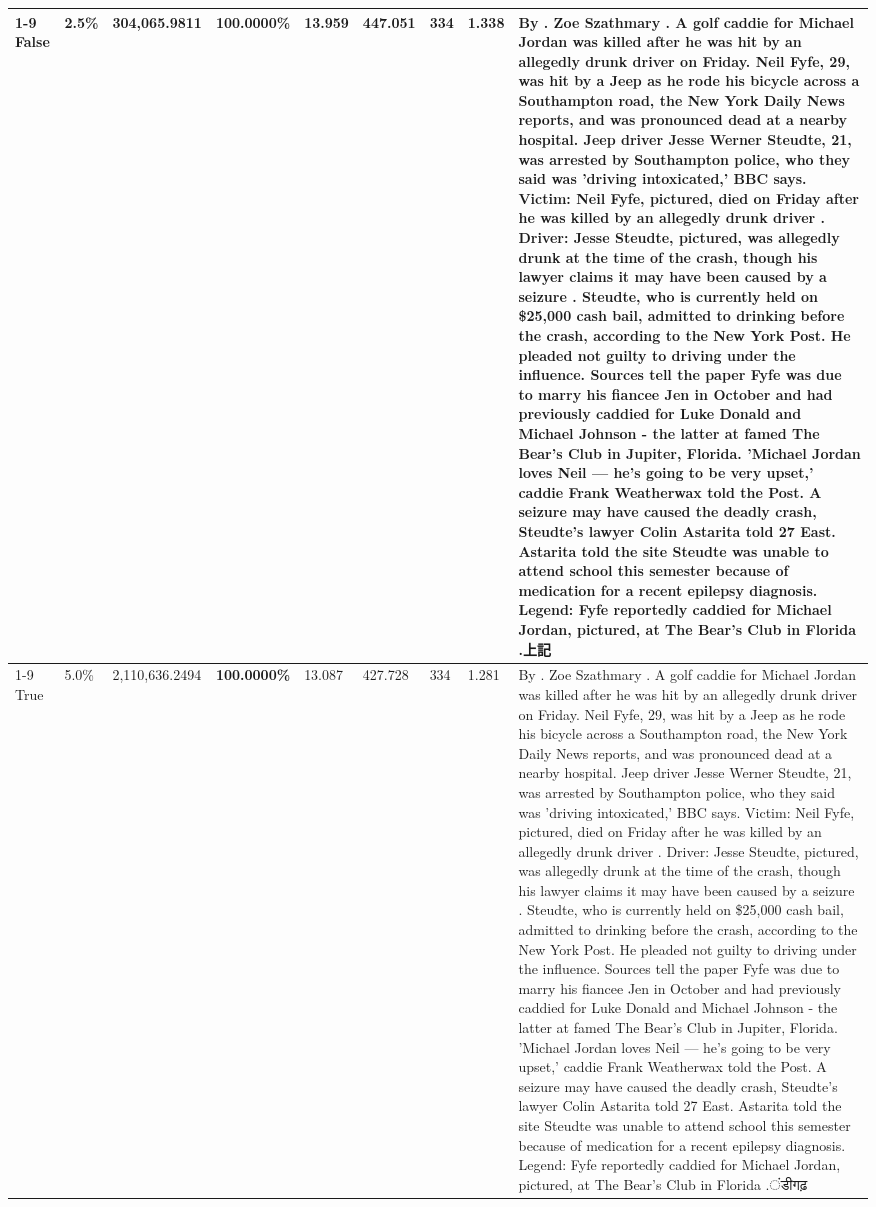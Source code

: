 \begin{table}[H]
\begin{tabular}{lllrlllll}
\cline{1-9}
False & 2.5\% & 304,065.9811 & \bfseries \color{red} 100.0000\% & 13.959 & 447.051 & 334 & 1.338 & By . Zoe Szathmary . A golf caddie for Michael Jordan was killed after he was hit by an allegedly drunk driver on Friday. Neil Fyfe, 29, was hit by a Jeep as he rode his bicycle across a Southampton road, the New York Daily News reports, and was pronounced dead at a nearby hospital. Jeep driver Jesse Werner Steudte, 21, was arrested by Southampton police, who they said was 'driving intoxicated,' BBC says. Victim: Neil Fyfe, pictured, died on Friday after he was killed by an allegedly drunk driver . Driver: Jesse Steudte, pictured, was allegedly drunk at the time of the crash, though his lawyer claims it may have been caused by a seizure . Steudte, who is currently held on \$25,000 cash bail, admitted to drinking before the crash, according to the New York Post. He pleaded not guilty to driving under the influence. Sources tell the paper Fyfe was due to marry his fiancee Jen in October and had previously caddied for Luke Donald and Michael Johnson - the latter at famed The Bear's Club in Jupiter, Florida. 'Michael Jordan loves Neil — he’s going to be very upset,' caddie Frank Weatherwax told the Post. A seizure may have caused the deadly crash, Steudte's lawyer Colin Astarita told 27 East. Astarita told the site Steudte was unable to attend school this semester because of medication for a recent epilepsy diagnosis. Legend: Fyfe reportedly caddied for Michael Jordan, pictured, at The Bear's Club in Florida .上記 \\
\cline{1-9}
True & 5.0\% & 2,110,636.2494 & \bfseries \color{red} 100.0000\% & 13.087 & 427.728 & 334 & 1.281 & By . Zoe Szathmary . A golf caddie for Michael Jordan was killed after he was hit by an allegedly drunk driver on Friday. Neil Fyfe, 29, was hit by a Jeep as he rode his bicycle across a Southampton road, the New York Daily News reports, and was pronounced dead at a nearby hospital. Jeep driver Jesse Werner Steudte, 21, was arrested by Southampton police, who they said was 'driving intoxicated,' BBC says. Victim: Neil Fyfe, pictured, died on Friday after he was killed by an allegedly drunk driver . Driver: Jesse Steudte, pictured, was allegedly drunk at the time of the crash, though his lawyer claims it may have been caused by a seizure . Steudte, who is currently held on \$25,000 cash bail, admitted to drinking before the crash, according to the New York Post. He pleaded not guilty to driving under the influence. Sources tell the paper Fyfe was due to marry his fiancee Jen in October and had previously caddied for Luke Donald and Michael Johnson - the latter at famed The Bear's Club in Jupiter, Florida. 'Michael Jordan loves Neil — he’s going to be very upset,' caddie Frank Weatherwax told the Post. A seizure may have caused the deadly crash, Steudte's lawyer Colin Astarita told 27 East. Astarita told the site Steudte was unable to attend school this semester because of medication for a recent epilepsy diagnosis. Legend: Fyfe reportedly caddied for Michael Jordan, pictured, at The Bear's Club in Florida .ंडीगढ़ \\

\end{tabular}
\end{table}
